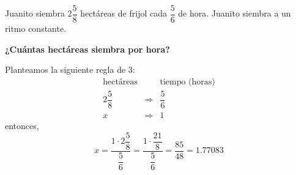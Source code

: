 Juanito siembra $2\dfrac{5}{8}$ hectáreas de frijol cada $\dfrac{5}{6}$ de hora. Juanito siembra a un ritmo constante.

\textbf{¿Cuántas hectáreas siembra por hora?}

\begin{solutionbox}{6cm}
    Planteamos la siguiente regla de 3:
    \[
        \begin{array}{rcl}
            \text{hectáreas} &             & \text{tiempo (horas)} \\
            2\dfrac{5}{8}    & \Rightarrow & \dfrac{5}{6}          \\
            x                & \Rightarrow & 1
        \end{array}
    \]
    entonces,
    \[x=\dfrac{1 \cdot 2\dfrac{5}{8}}{\dfrac{5}{6}}=\dfrac{1 \cdot \dfrac{21}{8}}{\dfrac{5}{6}}=\dfrac{85}{48}=1.77083\]
\end{solutionbox}